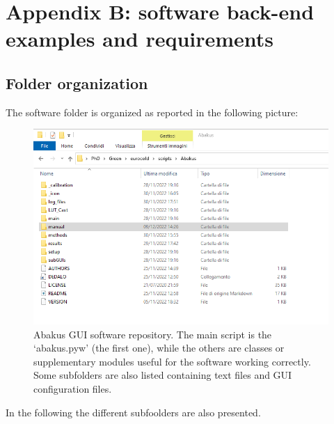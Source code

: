 \documentclass[a4paper, 11pt]{report}
\begin{document}


\newpage
\chapter{Appendix B: software back-end examples and requirements}

\section{Folder organization}
The software folder is organized as reported in the following picture: 
\begin{figure}[!htb]
	\centering
	\includegraphics[scale=0.75]{folder.png}
	\caption{Abakus GUI software repository. The main script is the `abakus.pyw' (the first one), while the others are classes or supplementary modules useful for the software working correctly. Some subfolders are also listed containing text files and GUI configuration files.}
\end{figure}
\newline
In the following the different subfoolders are also presented.
\newpage
\end{document}
